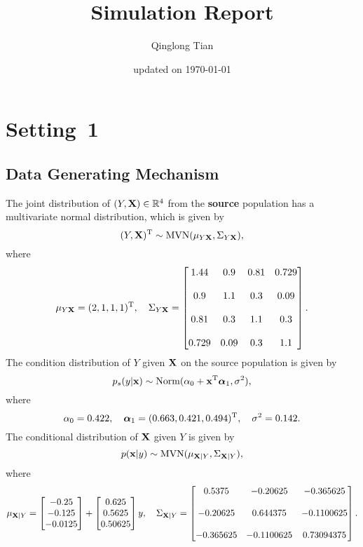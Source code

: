 \documentclass[12pt]{article}
\title{Simulation Report}
\author{Qinglong Tian}
\date{updated on \today}
\def\X{{\bf X}}
\def\x{{\bf x}}
\def\ba{{\boldsymbol\alpha}}
\def\0{{\bf 0}}
\def\trans{^{\rm T}}
\begin{document}
\maketitle

\section*{Setting~1}

\subsection*{Data Generating Mechanism}

The joint distribution of $(Y,\X)\in\mathbb{R}^4$ from the \textbf{source} population has a multivariate normal distribution, which is given by
\[
(Y,\X)\trans\sim\mathrm{MVN}(\mu_{Y\X}, \Sigma_{Y\X}),
\]
where
\[
\mu_{Y\X}=(2,1,1,1)\trans,\quad\Sigma_{Y\X}=\begin{bmatrix} 1.44 & 0.9 & 0.81 & 0.729 \\\\ 0.9 & 1.1 & 0.3 & 0.09 \\\\ 0.81 & 0.3 & 1.1 & 0.3 \\\\ 0.729 & 0.09 & 0.3 & 1.1 \end{bmatrix}.
\]
The condition distribution of $Y$ given $\X$ on the source population is given by
\[
p_s(y|\x)\sim\mathrm{Norm}(\alpha_0+\x\trans\ba_1, \sigma^2),
\]
where
\[
\alpha_0=0.422,\quad\ba_1=(0.663, 0.421, 0.494)\trans,\quad\sigma^2=0.142.
\]
The conditional distribution of $\X$ given $Y$ is given by
\[
p(\x|y)\sim\mathrm{MVN}(\mu_{\X|Y}, \Sigma_{\X|Y}),
\]
where
\[
\mu_{\X|Y}=\begin{bmatrix}
	-0.25\\-0.125\\-0.0125
\end{bmatrix}+
\begin{bmatrix}
	0.625\\0.5625\\0.50625
\end{bmatrix}y,\quad\Sigma_{\X|Y}=\begin{bmatrix} 0.5375 & -0.20625 & -0.365625 \\\\ -0.20625 & 0.644375 & -0.1100625 \\\\ -0.365625 & -0.1100625 & 0.73094375 \end{bmatrix}.
\]
\end{document}
